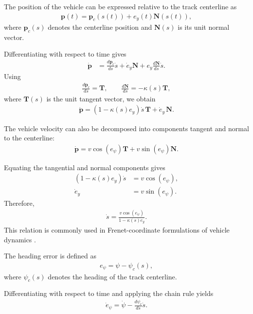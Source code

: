 The position of the vehicle can be expressed relative to the track centerline as
\begin{align*}
    \mathbf{p}(t)
    =
    \mathbf{p}_c(s(t))
    +
    e_y(t)\mathbf{N}(s(t)),
\end{align*}
where $\mathbf{p}_c(s)$ denotes the centerline position and
$\mathbf{N}(s)$ is its unit normal vector.

Differentiating with respect to time gives
\begin{align*}
    \dot{\mathbf{p}}
    &=
    \frac{d\mathbf{p}_c}{ds}\dot{s}
    +
    \dot{e}_y\mathbf{N}
    +
    e_y\frac{d\mathbf{N}}{ds}\dot{s}.
\end{align*}
Using
\begin{align*}
    \frac{d\mathbf{p}_c}{ds}=\mathbf{T},
    \qquad
    \frac{d\mathbf{N}}{ds}=-\kappa(s)\mathbf{T},
\end{align*}
where $\mathbf{T}(s)$ is the unit tangent vector, we obtain
\begin{align*}
    \dot{\mathbf{p}}
    =
    \left(1-\kappa(s)e_y\right)\dot{s}\,\mathbf{T}
    +
    \dot{e}_y\,\mathbf{N}.
\end{align*}

The vehicle velocity can also be decomposed into components tangent and
normal to the centerline:
\begin{align*}
    \dot{\mathbf{p}}
    =
    v\cos(e_\psi)\mathbf{T}
    +
    v\sin(e_\psi)\mathbf{N}.
\end{align*}

Equating the tangential and normal components gives
\begin{align*}
    \left(1-\kappa(s)e_y\right)\dot{s}
    &=
    v\cos(e_\psi), \\
    \dot{e}_y
    &=
    v\sin(e_\psi).
\end{align*}
Therefore,
\begin{align*}
    \dot{s}
    =
    \frac{v\cos(e_\psi)}
    {1-\kappa(s)e_y}.
\end{align*}
This relation is commonly used in Frenet-coordinate formulations of vehicle
dynamics \cite{Reiter2023Frenet}.

The heading error is defined as
\begin{align*}
    e_\psi = \psi-\psi_c(s),
\end{align*}
where $\psi_c(s)$ denotes the heading of the track centerline.

Differentiating with respect to time and applying the chain rule yields
\begin{align*}
    \dot e_\psi
    =
    \dot\psi
    -
    \frac{d\psi_c}{ds}\dot s.
\end{align*}

